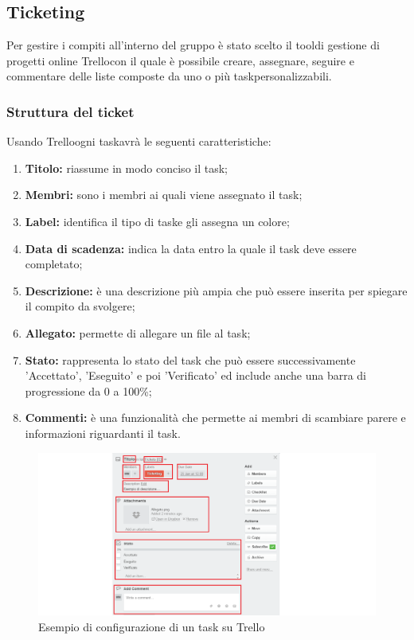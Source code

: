 \documentclass[a4paper,11pt]{article}
\begin{document}
		\subsection{Ticketing}
		\label{subsec:ticketing}
		Per gestire i compiti all'interno del gruppo è stato scelto il tool\addglos di gestione di progetti online Trello\addglos con il quale è possibile creare, assegnare, seguire e commentare delle liste composte da uno o più task\addglos personalizzabili. 
		\subsubsection{Struttura del ticket}
		Usando Trello\addglos ogni task\addglos  avrà le seguenti caratteristiche:
		
		\begin{enumerate}
		\item \textbf{Titolo:} riassume in modo conciso il task\addglos;
		\item \textbf{Membri:} sono i membri ai quali viene assegnato il task;
		\item \textbf{Label:} identifica il tipo di task\addglos e gli assegna un colore;
		\item \textbf{Data di scadenza:} indica la data entro la quale il task deve essere completato;
		\item \textbf{Descrizione:} è una descrizione più ampia che può essere inserita per spiegare il compito da svolgere;
		\item \textbf{Allegato:} permette di allegare un file al task;
		\item \textbf{Stato:} rappresenta lo stato del task che può essere successivamente 'Accettato', 'Eseguito' e poi 'Verificato' ed include anche una barra di progressione da 0 a 100\%; 
		\item \textbf{Commenti:} è una funzionalità che permette ai membri di scambiare parere e informazioni riguardanti il task.
		
		\end{enumerate}
		
		\begin{figure}[htbp]
		\centering
		\includegraphics[scale=0.50]{./images/tuto2.png}
		\caption{Esempio di configurazione di un task su Trello}			
			
		\end{figure}
		
\end{document}
